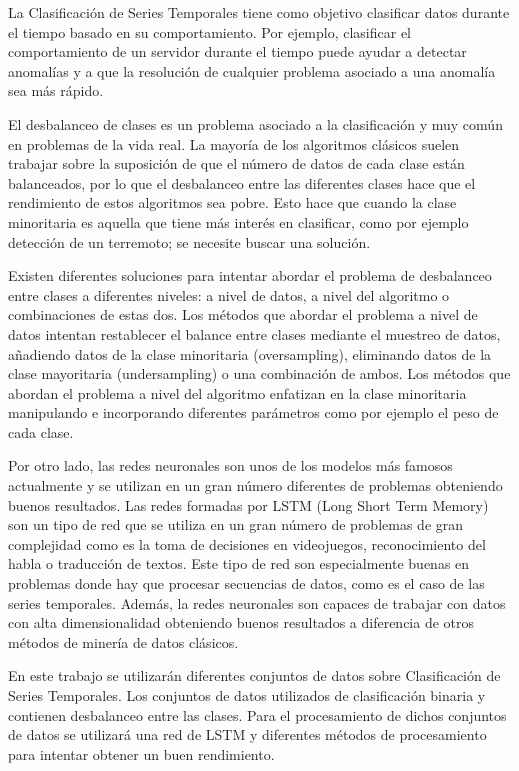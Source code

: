 La Clasificación de Series Temporales tiene como objetivo clasificar datos durante el tiempo basado en su comportamiento. Por ejemplo, clasificar el comportamiento de un servidor durante el tiempo puede ayudar a detectar anomalías y a que la resolución de cualquier problema asociado a una anomalía sea más rápido.\newline

El desbalanceo de clases es un problema asociado a la clasificación y muy común en problemas de la vida real. La mayoría de los algoritmos clásicos suelen trabajar sobre la suposición de que el número de datos de cada clase están balanceados, por lo que el desbalanceo entre las diferentes clases hace que el rendimiento de estos algoritmos sea pobre. Esto hace que cuando la clase minoritaria es aquella que tiene más interés en clasificar, como por ejemplo detección de un terremoto; se necesite buscar una solución.\newline

Existen diferentes soluciones para intentar abordar el problema de desbalanceo entre clases a diferentes niveles: a nivel de datos, a nivel del algoritmo o combinaciones de estas dos. Los métodos que abordar el problema a nivel de datos intentan restablecer el balance entre clases mediante el muestreo de datos, añadiendo datos de la clase minoritaria (oversampling), eliminando datos de la clase mayoritaria (undersampling) o una combinación de ambos. Los métodos que abordan el problema a nivel del algoritmo enfatizan en la clase minoritaria manipulando e incorporando diferentes parámetros como por ejemplo el peso de cada clase.\newline

Por otro lado, las redes neuronales son unos de los modelos más famosos actualmente y se utilizan en un gran número diferentes de problemas obteniendo buenos resultados. Las redes formadas por LSTM (Long Short Term Memory) son un tipo de red que se utiliza en un gran número de problemas de gran complejidad como es la toma de decisiones en videojuegos, reconocimiento del habla o traducción de textos. Este tipo de red son especialmente buenas en problemas donde hay que procesar secuencias de datos, como  es el caso de las series temporales. Además, la redes neuronales son capaces de trabajar con datos con alta dimensionalidad obteniendo buenos resultados a diferencia de otros métodos de minería de datos clásicos.\newline

En este trabajo se utilizarán diferentes conjuntos de datos sobre Clasificación de Series Temporales. Los conjuntos de datos utilizados de clasificación binaria y contienen desbalanceo entre las clases. Para el procesamiento de dichos conjuntos de datos se utilizará una red de LSTM y diferentes métodos de procesamiento para intentar obtener un buen rendimiento.\newline

